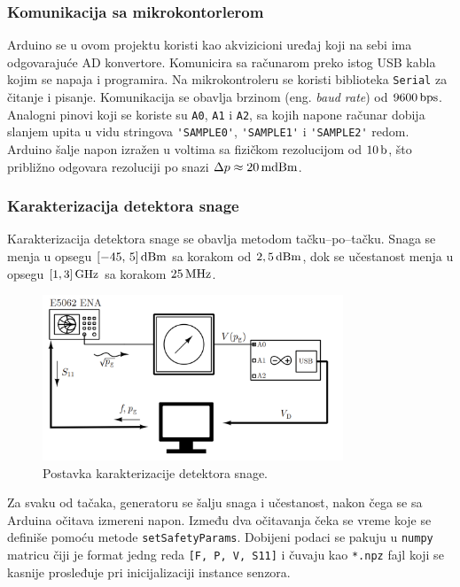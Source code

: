 \documentclass[a4paper, 12pt, diplomski]{etf}
\newcommand{\unit}[1]{\,{\rm #1}}
\begin{document}
\subsubsection{Komunikacija sa mikrokontorlerom}
Arduino se u ovom projektu koristi kao akvizicioni uređaj koji na
sebi ima odgovarajuće AD konvertore. Komunicira sa računarom preko
istog USB kabla kojim se napaja i programira. Na mikrokontroleru 
se koristi biblioteka \verb|Serial| za čitanje i pisanje. 
Komunikacija se obavlja brzinom (eng. \textit{baud rate}) 
od $9600\unit{bps}$. Analogni pinovi koji se koriste su 
\verb|A0|, \verb|A1| i \verb|A2|, sa kojih napone računar dobija 
slanjem upita u vidu stringova \verb|'SAMPLE0'|, \verb|'SAMPLE1'| i \verb|'SAMPLE2'| redom.
Arduino šalje napon izražen u voltima sa fizičkom rezolucijom od 
$10\unit{b}$, što približno odgovara rezoluciji po 
snazi $\Delta p \approx 20\unit{mdBm}$.

\subsubsection{Karakterizacija detektora snage
\label{ss:kds}}
Karakterizacija detektora snage se obavlja metodom tačku--po--tačku.
Snaga se menja u opsegu $[-45,\,5]\unit{dBm}$ sa korakom od 
$2,5\unit{dBm}$, dok se učestanost menja u opsegu $[1, 3]\unit{GHz}$
sa korakom $25\unit{MHz}$.
\begin{figure}[ht!]
    \centering
    \includegraphics[width=0.8\textwidth]{fig/cal_meas.png}
    \caption{Postavka karakterizacije detektora snage.}
    \label{fig:cal}
\end{figure}
Za svaku od tačaka, generatoru se šalju snaga i učestanost,
nakon čega se sa Arduina očitava izmereni napon. 
Između dva očitavanja čeka se vreme koje se definiše
pomoću metode \verb|setSafetyParams|.
Dobijeni podaci se pakuju u \verb|numpy| matricu 
čiji je format jedng reda \verb|[F, P, V, S11]|
i čuvaju kao \verb|*.npz| fajl koji se kasnije prosleđuje
pri inicijalizaciji instance senzora.
\end{document}
